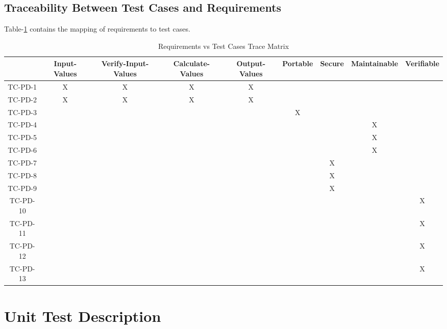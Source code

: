 \documentclass[12pt, titlepage]{article}
\begin{document}
\subsection{Traceability Between Test Cases and Requirements}


Table-\ref{tblTrace} contains the mapping of requirements to test cases.
  
\begin{table}[]
\begin{adjustbox}{width=1.29\textwidth}
\begin{tabular}{c|c|c|c|c|c|c|c|c|}
 & Input-Values & Verify-Input-Values & Calculate-Values & Output-Values & Portable & Secure & Maintainable & Verifiable \\ \hline
TC-PD-1 & X & X & X  & X  &  &  &  &  \\
TC-PD-2 & X  & X  & X & X &  &  &  &  \\
TC-PD-3  &  &  &  &   & X  &  &  &  \\
TC-PD-4  &  &  &  &  &  &  &X  &  \\
TC-PD-5  &  &  &  &  &  &  &X  &  \\
TC-PD-6  &  &  &  &  &  &  &X  &  \\
TC-PD-7  &  &  &  &  &  &X  &  &  \\
TC-PD-8  &  &  &  &  &  &X  &  &  \\
TC-PD-9  &  &  &  &  &  &X  &  &  \\
TC-PD-10 &  &  &  &  &  &  &  &X  \\
TC-PD-11 &  &  &  &  &  &  &  &X \\
TC-PD-12 &  &  &   &   &  &  &  &X  \\
TC-PD-13 &   &  &  &  &  &  &  &X \\
\end{tabular}
\end{adjustbox}
\caption{Requirements vs Test Cases Trace Matrix}
\label{tblTrace}
\end{table}

\section{Unit Test Description}  \label{sec_unit_tests}

\end{document}
